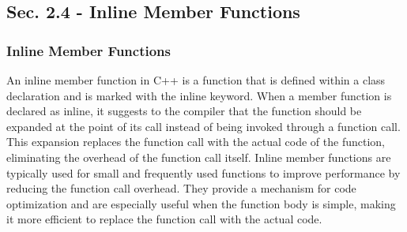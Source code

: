 \subsection*{Sec. 2.4 - Inline Member Functions}
\subsubsection*{Inline Member Functions}

An inline member function in C++ is a function that is defined within a class declaration and is marked with the inline keyword. When a member function is declared as inline, it suggests to the compiler that 
the function should be expanded at the point of its call instead of being invoked through a function call. This expansion replaces the function call with the actual code of the function, eliminating the overhead 
of the function call itself. Inline member functions are typically used for small and frequently used functions to improve performance by reducing the function call overhead. They provide a mechanism for code 
optimization and are especially useful when the function body is simple, making it more efficient to replace the function call with the actual code.

